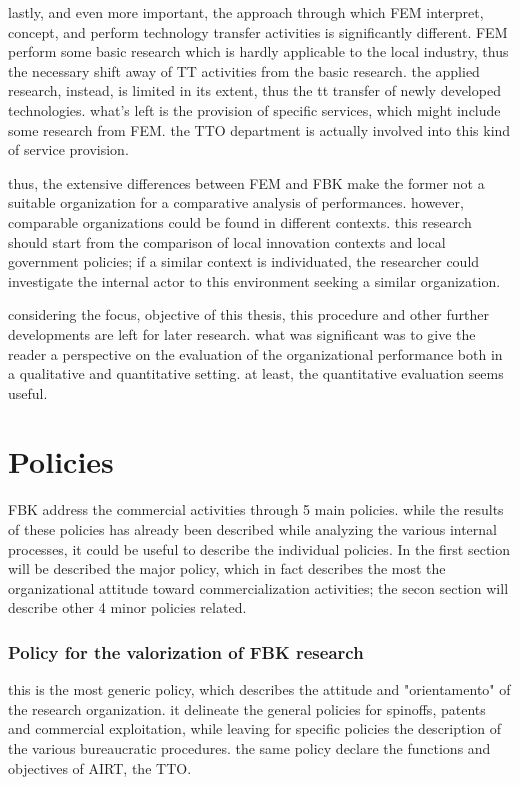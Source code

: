 lastly, and even more important, the approach through which FEM interpret, concept, and perform technology transfer activities is significantly different. FEM perform some basic research which is hardly applicable to the local industry, thus the necessary shift away of TT activities from the basic research. the applied research, instead, is limited in its extent, thus the tt transfer of newly developed technologies. what's left is the provision of specific services, which might include some research from FEM. the TTO department is actually involved into this kind of service provision.

thus, the extensive differences between FEM and FBK make the former not a suitable organization for a comparative analysis of performances. however, comparable organizations could be found in different contexts. this research should start from the comparison of local innovation contexts and local government policies; if a similar context is individuated, the researcher could investigate the internal actor to this environment seeking a similar organization. 

considering the focus, objective of this thesis, this procedure and other further developments are left for later research. what was significant was to give the reader a perspective on the evaluation of the organizational performance both in a qualitative and quantitative setting. at least, the quantitative evaluation seems useful.

\section{Policies}

FBK address the commercial activities through 5 main policies. while the results of these policies has already been described while analyzing the various internal processes, it could be useful to describe the individual policies. In the first section will be described the major policy, which in fact describes the most the organizational attitude toward commercialization activities; the secon section will describe other 4 minor policies related.

\subsubsection{Policy for the valorization of FBK research}

this is the most generic policy, which describes the attitude and "orientamento" of the research organization. it delineate the general policies for spinoffs, patents and commercial exploitation, while leaving for specific policies the description of the various bureaucratic procedures. the same policy declare the functions and objectives of AIRT, the TTO.

